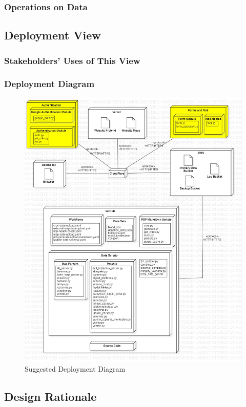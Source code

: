 \subsubsection{Operations on Data}

\subsection{Deployment View}

\subsubsection{Stakeholders' Uses of This View}

\subsubsection{Deployment Diagram}

\begin{figure}[H]
  \centering
  \includegraphics[width=\linewidth]{img/deployment-diagram-s5.jpg}
  \caption{Suggested Deployment Diagram}
\end{figure}

\subsection{Design Rationale}
